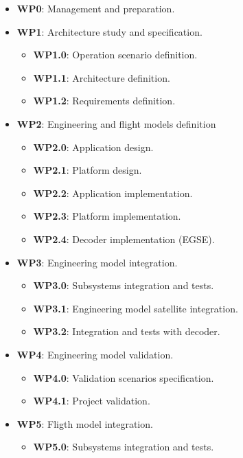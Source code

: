 \begin{itemize}
    \item \textbf{WP0}: Management and preparation.
    \item \textbf{WP1}: Architecture study and specification.
        \begin{itemize}
            \item \textbf{WP1.0}: Operation scenario definition.
            \item \textbf{WP1.1}: Architecture definition.
            \item \textbf{WP1.2}: Requirements definition.
        \end{itemize}
    \item \textbf{WP2}: Engineering and flight models definition
        \begin{itemize}
            \item \textbf{WP2.0}: Application design.
            \item \textbf{WP2.1}: Platform design.
            \item \textbf{WP2.2}: Application implementation.
            \item \textbf{WP2.3}: Platform implementation.
            \item \textbf{WP2.4}: Decoder implementation (EGSE).
        \end{itemize}
    \item \textbf{WP3}: Engineering model integration.
        \begin{itemize}
            \item \textbf{WP3.0}: Subsystems integration and tests.
            \item \textbf{WP3.1}: Engineering model satellite integration.
            \item \textbf{WP3.2}: Integration and tests with decoder.
        \end{itemize}
    \item \textbf{WP4}: Engineering model validation.
        \begin{itemize}
            \item \textbf{WP4.0}: Validation scenarios specification.
            \item \textbf{WP4.1}: Project validation.
        \end{itemize}
    \item \textbf{WP5}: Fligth model integration.
        \begin{itemize}
            \item \textbf{WP5.0}: Subsystems integration and tests.

\end{itemize}
\end{itemize}
